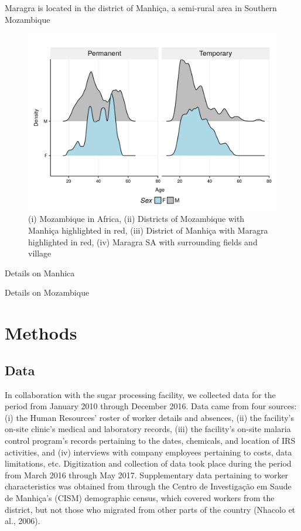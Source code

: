 \documentclass[]{article}
\begin{document}
Maragra is located in the district of Manhiça, a semi-rural area in
Southern Mozambique

\begin{figure}[H]

{\centering \includegraphics{figures/unnamed-chunk-13-1} 

}

\caption{(i) Mozambique in Africa, (ii) Districts of Mozambique with Manhiça highlighted in red, (iii) District of Manhiça with Maragra highlighted in red, (iv) Maragra SA with surrounding fields and village}\label{fig:unnamed-chunk-13}
\end{figure}

Details on Manhica

Details on Mozambique

\section{Methods}\label{methods}

\subsection{Data}\label{data}

In collaboration with the sugar processing facility, we collected data
for the period from January 2010 through December 2016. Data came from
four sources: (i) the Human Resources' roster of worker details and
absences, (ii) the facility's on-site clinic's medical and laboratory
records, (iii) the facility's on-site malaria control program's records
pertaining to the dates, chemicals, and location of IRS activities, and
(iv) interviews with company employees pertaining to costs, data
limitations, etc. Digitization and collection of data took place during
the period from March 2016 through May 2017. Supplementary data
pertaining to worker characteristics was obtained from through the
Centro de Investigação em Saude de Manhiça's (CISM) demographic census,
which covered workers from the district, but not those who migrated from
other parts of the country (Nhacolo et al., 2006).
\end{document}
